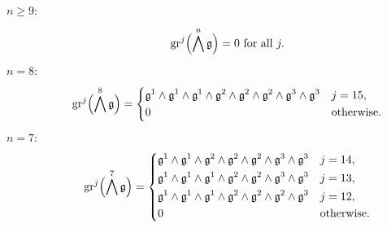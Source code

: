 \begin{description}
  \item[$n\geq9:$]
        \begin{equation*}
          \operatorname{gr}^{j}\Bigl( \bigwedge^{n}\mathfrak{g} \Bigr) = 0 \text{ for all } j.
        \end{equation*}
  \item[$n=8:$]
        \begin{equation*}
          \operatorname{gr}^{j}\Bigl( \bigwedge^{8}\mathfrak{g} \Bigr) =
          \begin{dcases}
            \mathfrak{g}^{1} \wedge \mathfrak{g}^{1} \wedge \mathfrak{g}^{1} \wedge \mathfrak{g}^{2} \wedge \mathfrak{g}^{2} \wedge \mathfrak{g}^{2} \wedge \mathfrak{g}^{3} \wedge \mathfrak{g}^{3} & j=15, \\
            0                                                                                                         & \text{otherwise.}
          \end{dcases}
        \end{equation*}
  \item[$n=7:$]
        \begin{equation*}
          \operatorname{gr}^{j}\Bigl( \bigwedge^{7}\mathfrak{g} \Bigr) =
          \begin{dcases}
            \mathfrak{g}^{1} \wedge \mathfrak{g}^{1} \wedge \mathfrak{g}^{2} \wedge \mathfrak{g}^{2} \wedge \mathfrak{g}^{2} \wedge \mathfrak{g}^{3} \wedge \mathfrak{g}^{3}                    & j=14, \\
            \mathfrak{g}^{1} \wedge \mathfrak{g}^{1} \wedge \mathfrak{g}^{1} \wedge \mathfrak{g}^{2} \wedge \mathfrak{g}^{2} \wedge \mathfrak{g}^{3} \wedge \mathfrak{g}^{3}                    & j=13, \\
            \mathfrak{g}^{1} \wedge \mathfrak{g}^{1} \wedge \mathfrak{g}^{1} \wedge \mathfrak{g}^{2} \wedge \mathfrak{g}^{2} \wedge \mathfrak{g}^{2} \wedge \mathfrak{g}^{3}                    & j=12, \\
            0                                                                                                               & \text{otherwise.}
          \end{dcases}
        \end{equation*}


\end{description}
